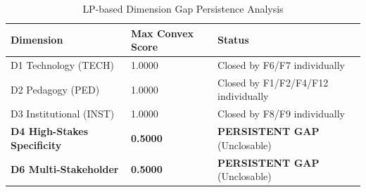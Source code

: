 \documentclass[11pt,a4paper]{article}
\begin{document}
\begin{table}[ht]
  \caption{LP-based Dimension Gap Persistence Analysis}
  \label{tab:lp_gaps}
  \centering
  \renewcommand{\arraystretch}{1.3}
  \begin{tabular}{@{} L{4.5cm} C{3.0cm} L{6.0cm} @{} }
    \toprule
    \textbf{Dimension} & \textbf{Max Convex Score} & \textbf{Status} \\
    \midrule
    D1 Technology (TECH) & 1.0000 & Closed by F6/F7 individually \\
    D2 Pedagogy (PED) & 1.0000 & Closed by F1/F2/F4/F12 individually \\
    D3 Institutional (INST) & 1.0000 & Closed by F8/F9 individually \\
    \textbf{D4 High-Stakes Specificity} & \textbf{0.5000} & \textbf{PERSISTENT GAP} (Unclosable) \\
    \textbf{D6 Multi-Stakeholder} & \textbf{0.5000} & \textbf{PERSISTENT GAP} (Unclosable) \\
    \bottomrule
  \end{tabular}
\end{table}
\end{document}
